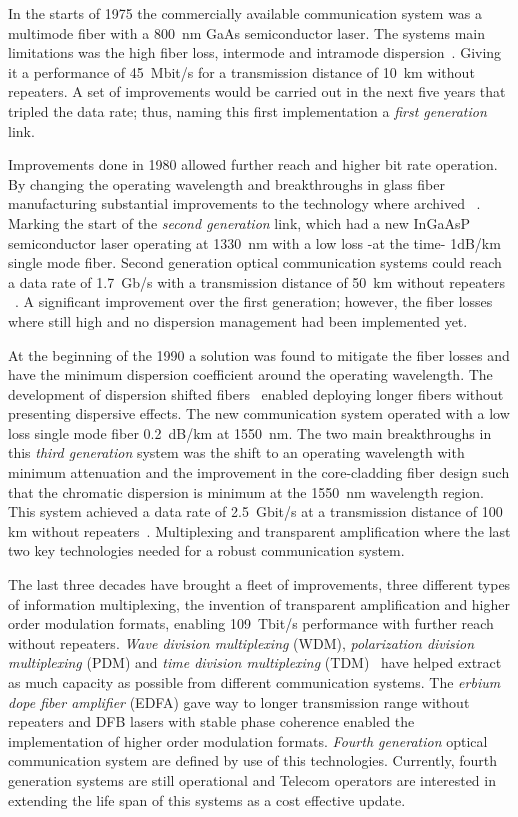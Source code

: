 In the starts of 1975 the commercially available communication system was a multimode fiber with a 800~nm GaAs semiconductor laser. The systems main limitations was the high fiber loss, intermode and intramode dispersion~\cite{OFCNetwork}.  Giving it a performance of 45~Mbit/s for a transmission distance of 10~km without repeaters. A set of improvements  would be carried out in the next five years that tripled the data rate; thus, naming this first implementation a\emph{ first generation} link.~\cite{COChistory} 

Improvements done in 1980 allowed further reach and higher bit rate operation. By changing the operating wavelength and breakthroughs in glass fiber manufacturing substantial improvements to the technology where archived ~\cite{COChistory,Sharma2013ARO}. Marking the start of the \emph{second generation} link, which had a new  InGaAsP semiconductor laser operating at 1330~nm with a low loss -at the time- 1dB/km single mode fiber. Second generation optical communication systems could reach a data rate of 1.7~Gb/s with a transmission distance of 50~km without repeaters ~\cite{ModForm,Sharma2013ARO}. A significant improvement over the first generation; however, the fiber losses where still high and no dispersion management had been implemented yet. 

At the beginning of the 1990 a solution was found to mitigate the fiber losses and have the minimum dispersion coefficient around the operating wavelength. The development of dispersion shifted fibers~\cite{COChistory} enabled deploying longer fibers without presenting dispersive effects.  The new communication system operated with a low loss single mode fiber 0.2~dB/km at 1550~nm. The two main breakthroughs in this \emph{third generation} system was the shift to an operating wavelength with minimum attenuation and the improvement in the core-cladding fiber design such that the chromatic dispersion is minimum at the 1550~nm wavelength region. This system achieved a data rate of 2.5~Gbit/s at a
transmission distance of 100 km without repeaters~\cite{ModForm,Sharma2013ARO}. Multiplexing and transparent amplification  where the last two key technologies needed for a robust communication system.

The last three decades have brought a fleet of improvements, three different types of information multiplexing, the invention of transparent amplification and higher order modulation formats, enabling  109~Tbit/s performance with further reach without repeaters. \textit{Wave division multiplexing} (WDM), \textit{polarization division multiplexing} (PDM) and \textit{time division multiplexing} (TDM)~\cite{kikuchi2008coherent,ModForm,Sharma2013ARO} have helped extract as much capacity as possible from different communication systems. The \textit{erbium dope fiber amplifier} (EDFA) gave way to longer transmission range without repeaters and DFB lasers with stable phase coherence enabled the implementation of higher order modulation formats. \emph{Fourth generation} optical communication system are defined by use of this technologies. Currently, fourth generation systems are still operational and Telecom operators are interested in extending the life span of this systems as a cost effective update.    


